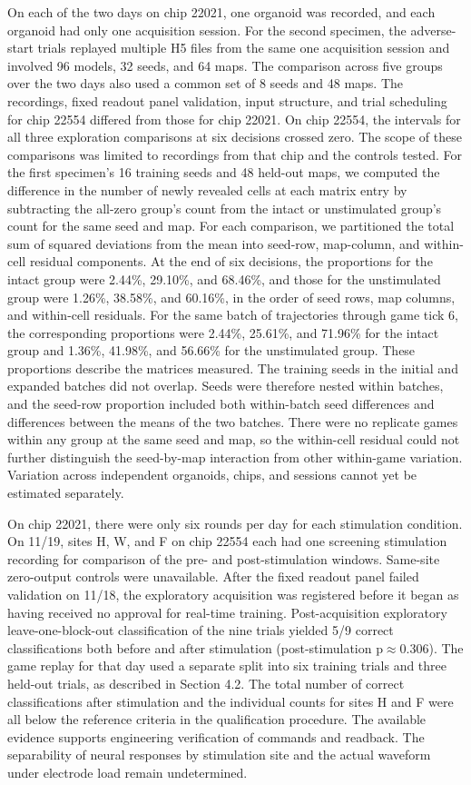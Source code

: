 \documentclass{article}
\begin{document}
On each of the two days on chip 22021, one organoid was recorded, and each organoid had only one acquisition session. For the second specimen, the adverse-start trials replayed multiple H5 files from the same one acquisition session and involved 96 models, 32 seeds, and 64 maps. The comparison across five groups over the two days also used a common set of 8 seeds and 48 maps. The recordings, fixed readout panel validation, input structure, and trial scheduling for chip 22554 differed from those for chip 22021. On chip 22554, the intervals for all three exploration comparisons at six decisions crossed zero. The scope of these comparisons was limited to recordings from that chip and the controls tested. For the first specimen's 16 training seeds and 48 held-out maps, we computed the difference in the number of newly revealed cells at each matrix entry by subtracting the all-zero group's count from the intact or unstimulated group's count for the same seed and map. For each comparison, we partitioned the total sum of squared deviations from the mean into seed-row, map-column, and within-cell residual components. At the end of six decisions, the proportions for the intact group were 2.44\%, 29.10\%, and 68.46\%, and those for the unstimulated group were 1.26\%, 38.58\%, and 60.16\%, in the order of seed rows, map columns, and within-cell residuals. For the same batch of trajectories through game tick 6, the corresponding proportions were 2.44\%, 25.61\%, and 71.96\% for the intact group and 1.36\%, 41.98\%, and 56.66\% for the unstimulated group. These proportions describe the matrices measured. The training seeds in the initial and expanded batches did not overlap. Seeds were therefore nested within batches, and the seed-row proportion included both within-batch seed differences and differences between the means of the two batches. There were no replicate games within any group at the same seed and map, so the within-cell residual could not further distinguish the seed-by-map interaction from other within-game variation. Variation across independent organoids, chips, and sessions cannot yet be estimated separately.


On chip 22021, there were only six rounds per day for each stimulation condition. On 11/19, sites H, W, and F on chip 22554 each had one screening stimulation recording for comparison of the pre- and post-stimulation windows. Same-site zero-output controls were unavailable. After the fixed readout panel failed validation on 11/18, the exploratory acquisition was registered before it began as having received no approval for real-time training. Post-acquisition exploratory leave-one-block-out classification of the nine trials yielded 5/9 correct classifications both before and after stimulation (post-stimulation p\ensuremath{\approx}0.306). The game replay for that day used a separate split into six training trials and three held-out trials, as described in Section 4.2. The total number of correct classifications after stimulation and the individual counts for sites H and F were all below the reference criteria in the qualification procedure. The available evidence supports engineering verification of commands and readback. The separability of neural responses by stimulation site and the actual waveform under electrode load remain undetermined.
\end{document}
